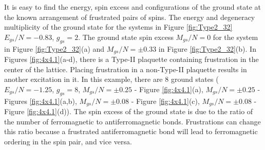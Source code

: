 \documentclass[utf8, babel, sor, jor, amsmath, amssymb, reprint]{elsarticle} %
\begin{document}
It is easy to find the energy, spin excess and configurations of the ground state at the known arrangement of frustrated pairs of spins. The energy and degeneracy multiplicity of the ground state for the systems in Figure \ref{fig:Type2_32} $E_{gs}/N=-0.83$, $g_{gs}=2$. The ground state spin excess $M_{gs}/N=0$ for the system in Figure \ref{fig:Type2_32}(a) and $M_{gs}/N=\pm 0.33$ in Figure \ref{fig:Type2_32}(b).
In Figures \ref{fig:4x4.1}(a-d), there is a Type-II plaquette containing frustration in the center of the lattice. Placing frustration in a non-Type-II plaquette results in another excitation in it. In this example, there are 8 ground states ($E_{gs}/N=-1.25$, $g_{gs}=8$, $M_{gs}/N=\pm 0.25$ - Figure \ref{fig:4x4.1}(a), $M_{gs}/N=\pm 0.25$ - Figures \ref{fig:4x4.1}(a,b), $M_{gs}/N=\pm 0.08$ - Figure \ref{fig:4x4.1}(c), $M_{gs}/N=\pm 0.08$ - Figure \ref{fig:4x4.1}(d)). The spin excess of the ground state is due to the ratio of the number of ferromagnetic to antiferromagnetic bonds. Frustrations can change this ratio because a frustrated antiferromagnetic bond will lead to ferromagnetic ordering in the spin pair, and vice versa.
\end{document}
